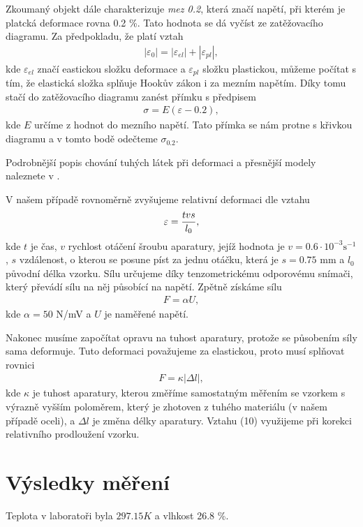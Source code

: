 \documentclass[a4paper,12pt]{article}
\begin{document}
Zkoumaný objekt dále charakterizuje \emph{mez 0.2}, která značí napětí, při kterém 
je platcká deformace rovna 0.2 \%. Tato hodnota se dá vyčíst ze zatěžovacího diagramu. 
Za předpokladu, že platí vztah
\begin{eqnarray}
	|\varepsilon_0|=|\varepsilon_{el}|+|\varepsilon_{pl}|,
\end{eqnarray}
kde $\varepsilon_{el}$ značí eastickou složku deformace a $\varepsilon_{pl}$ složku 
plastickou, můžeme počítat s tím, že elastická složka splňuje Hookův zákon i za 
mezním napětím. Díky tomu stačí do zatěžovacího diagramu zanést přímku s předpisem 
\begin{eqnarray}
	\sigma=E(\varepsilon-0.2),
\end{eqnarray}
kde $E$ určíme z hodnot do mezního napětí. Tato přímka se nám protne s křivkou 
diagramu a v tomto bodě odečteme $\sigma_{0.2}$. 

Podrobnější popis chování tuhých látek při deformaci a přesnější modely naleznete v \cite{2}.

V našem případě rovnoměrně zvyšujeme relativní deformaci dle vztahu
\begin{eqnarray}
	\varepsilon={tvs \over l_0},
\end{eqnarray}
kde $t$ je čas, $v$ rychlost otáčení šroubu aparatury, jejíž hodnota je 
$v=0.6\cdot10^{-3}\mbox{s}^{-1}$, $s$ vzdálenost, o kterou se posune píst za 
jednu otáčku, která je $s=0.75$ mm a $l_0$ původní délka vzorku. Sílu určujeme 
díky tenzometrickému odporovému snímači, který převádí sílu na něj působící na 
napětí. Zpětně získáme sílu
\begin{eqnarray}
	F=\alpha U,
\end{eqnarray} 
kde $\alpha=50$ N/mV a $U$ je naměřené napětí.

Nakonec musíme započítat opravu na tuhost aparatury, protože se působením síly 
sama deformuje. Tuto deformaci považujeme za elastickou, proto musí splňovat rovnici
\begin{eqnarray}
	F=\kappa |\Delta l|,
\end{eqnarray}
kde $\kappa$ je tuhost aparatury, kterou změříme samostatným měřením se vzorkem 
s výrazně vyšším poloměrem, který je zhotoven z tuhého materiálu (v našem případě oceli),  
a $\Delta l$ je změna délky aparatury. Vztahu (10) využijeme při korekci relativního prodloužení vzorku.

\eject
\section{Výsledky měření}
\noindent
Teplota v laboratoři byla $297.15K$  a vlhkost 26.8 \%.
\end{document}
